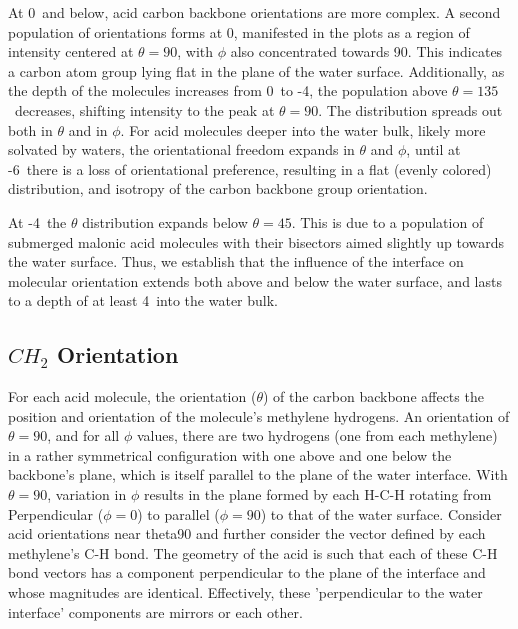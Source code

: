 At 0\angs~and below, acid carbon backbone orientations are more complex. A second population of orientations forms at 0\angs, manifested in the plots as a region of intensity centered at $\theta=90$\textdegree, with $\phi$ also concentrated towards 90\textdegree. This indicates a carbon atom group lying flat in the plane of the water surface. Additionally, as the depth of the molecules increases from 0\angs~to -4\angs, the population above $\theta=135$\textdegree~decreases, shifting intensity to the peak at $\theta=90$\textdegree. The distribution spreads out both in $\theta$ and in $\phi$. For acid molecules deeper into the water bulk, likely more solvated by waters, the orientational freedom expands in $\theta$ and $\phi$, until at -6\angs~there is a loss of orientational preference, resulting in a flat (evenly colored) distribution, and isotropy of the carbon backbone group orientation.

At -4\angs~the $\theta$ distribution expands below $\theta=45$\textdegree. This is due to a population of submerged malonic acid molecules with their bisectors aimed slightly up towards the water surface. Thus, we establish that the influence of the interface on molecular orientation extends both above and below the water surface, and lasts to a depth of at least 4\angs~into the water bulk.


\subsection {$CH_2$ Orientation}

For each acid molecule, the orientation ($\theta$) of the carbon backbone affects the position and orientation of the molecule's methylene hydrogens. An orientation of $\theta=90$\textdegree, and for all $\phi$ values, there are two hydrogens (one from each methylene) in a rather symmetrical configuration with one above and one below the backbone's plane, which is itself parallel to the plane of the water interface. With $\theta=90$\textdegree, variation in $\phi$ results in the plane formed by each H-C-H rotating from Perpendicular ($\phi=0$\textdegree) to parallel ($\phi=90$\textdegree) to that of the water surface. Consider acid orientations near theta90 and further consider the vector defined by each methylene's C-H bond. The geometry of the acid is such that each of these C-H bond vectors has a component perpendicular to the plane of the interface and whose magnitudes are identical. Effectively, these 'perpendicular to the water interface' components are mirrors or each other. 

